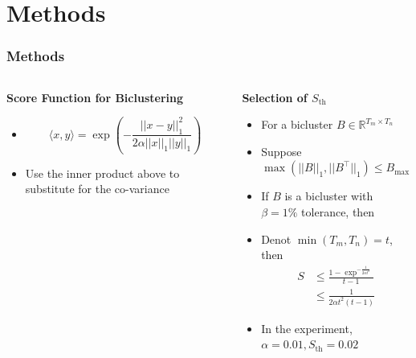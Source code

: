 \documentclass{beamer}
\begin{document}
\section{Methods}
\begin{frame}
    \frametitle{Methods}

    \begin{columns}
        \begin{column}{0.5\textwidth}
            \centering
            \textbf{Score Function for Biclustering}
            \begin{itemize}
                \item $$\langle x, y \rangle = \exp(-\frac{||x - y||_1^2}{2\alpha||x||_1||y||_1})$$
                \item Use the inner product above to substitute for the co-variance
            \end{itemize}
        \end{column}
        \begin{column}{0.5\textwidth}
            \centering
            \textbf{Selection of $S_{\text{th}}$}
            \begin{itemize}
                \item For a bicluster $B \in \mathbb{R}^{T_m \times T_n}$
                \item Suppose $\max(||B||_1,||B^{\top}||_1) \le B_{\max}$
                \item If $B$ is a bicluster with $\beta = 1\%$ tolerance, then
                \item Denot $\min (T_m, T_n) = t$, then
                \begin{align*}
                    S &\le \frac{1-\exp ^{-\frac{1}{2\alpha t ^2}}}{t - 1} \\
                    &\le \frac{1}{2 \alpha t ^2(t - 1)}
                \end{align*}
                \item In the experiment, $\alpha = 0.01, S_{\text{th}} = 0.02$
            \end{itemize}
        \end{column}
    \end{columns}

\end{frame}
\end{document}
